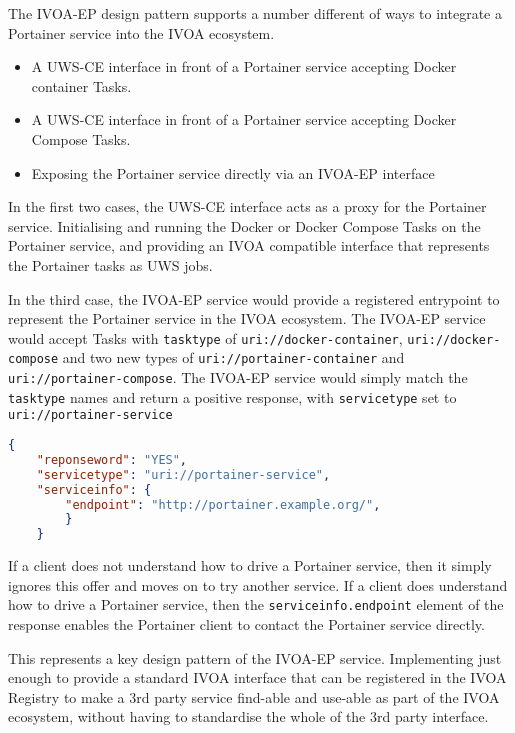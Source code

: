 \documentclass[11pt,a4paper]{ivoa}
\newcommand{\uws} {UWS\xspace}
\newcommand{\uwsce} {UWS-CE\xspace}
\newcommand{\ivoep} {IVOA-EP\xspace}
\newcommand{\docker} {Docker\xspace}
\newcommand{\dockercompose} {Docker Compose\xspace}
\newcommand{\portainer} {Portainer\xspace}
\newcommand{\codeword}[1] {\texttt{#1}}
\begin{document}
The \ivoep design pattern supports a number different of ways to integrate a \portainer service into the IVOA ecosystem.
\begin{itemize}
    \item A \uwsce interface in front of a \portainer service accepting \docker container Tasks.
    \item A \uwsce interface in front of a \portainer service accepting \dockercompose Tasks.
    \item Exposing the \portainer service directly via an \ivoep interface
\end{itemize}

In the first two cases, the \uwsce interface acts as a proxy for the \portainer service. Initialising and running the \docker or \dockercompose Tasks on the \portainer service, and providing an IVOA compatible interface that represents the \portainer tasks as \uws jobs.

In the third case, the \ivoep service would provide a registered entrypoint to represent the \portainer service in the IVOA ecosystem.
The \ivoep service would accept Tasks with \codeword{tasktype} of \codeword{uri://docker-container}, \codeword{uri://docker-compose} and two new types of \codeword{uri://portainer-container} and  \codeword{uri://portainer-compose}.
The \ivoep service would simply match the \codeword{tasktype} names and return a positive response, with \codeword{servicetype} set to \codeword{uri://portainer-service}

\begin{lstlisting}[language=json]
    {
    "reponseword": "YES",
    "servicetype": "uri://portainer-service",
    "serviceinfo": {
        "endpoint": "http://portainer.example.org/",
        }
    }
\end{lstlisting}

If a client does not understand how to drive a \portainer service, then it simply ignores this offer and moves on to try another service.
If a client does understand how to drive a \portainer service, then the \codeword{serviceinfo.endpoint} element of the response enables the \portainer client to contact the \portainer service directly.

This represents a key design pattern of the \ivoep service. Implementing just enough to provide a standard IVOA interface that can be registered in the IVOA Registry to make a 3rd party service find-able and use-able as part of the IVOA ecosystem, without having to standardise the whole of the 3rd party interface.
\end{document}
